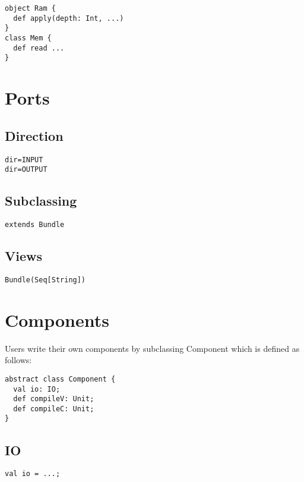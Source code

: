 \documentclass[10pt,twocolumn]{article}
\begin{document}
\begin{verbatim}
object Ram {
  def apply(depth: Int, ...)
}
class Mem {
  def read ...
}
\end{verbatim}

\section{Ports}

\subsection{Direction}

\begin{verbatim}
dir=INPUT
dir=OUTPUT
\end{verbatim}


\subsection{Subclassing}

\begin{verbatim}
extends Bundle
\end{verbatim}

\subsection{Views}

\begin{verbatim}
Bundle(Seq[String])
\end{verbatim}

\section{Components}

Users write their own components by subclassing Component which is
defined as follows:

\begin{verbatim}
abstract class Component {
  val io: IO;
  def compileV: Unit;
  def compileC: Unit;
}
\end{verbatim}

\subsection{IO}

\begin{verbatim}
val io = ...;
\end{verbatim}
\end{document}

